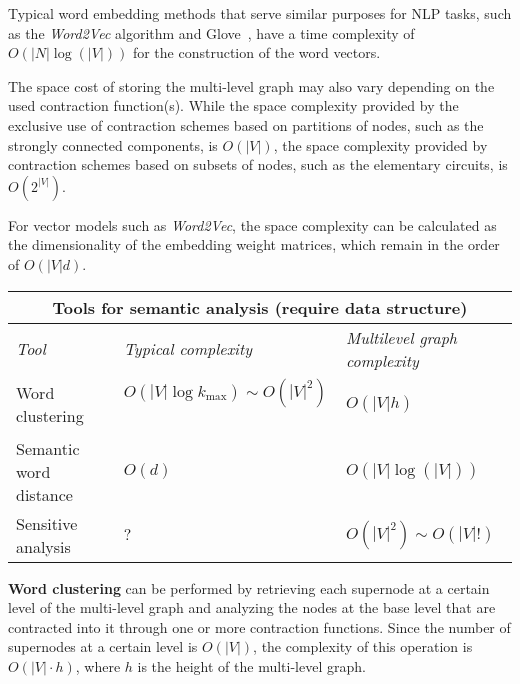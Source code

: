 Typical word embedding methods that serve similar purposes for NLP tasks, such as the \textit{Word2Vec} algorithm \cite{Mikolov13}
and Glove~\cite{Pennington14}, have a time complexity of $O(|N| \log(|V|))$ for the construction of the word vectors. \newline

The space cost of storing the multi-level graph may also vary depending on the used contraction function(s).
While the space complexity provided by the exclusive use of contraction schemes based on partitions of nodes, such as
the strongly connected components, is $O(|V|)$, the space complexity provided by contraction schemes based on subsets of
nodes, such as the elementary circuits, is $O(2^{|V|})$. \newline

For vector models such as \textit{Word2Vec}, the space complexity can be calculated as the dimensionality of the
embedding weight matrices, which remain in the order of $O(|V|d)$. \newline\newline


\begin{table}[hbt!]
    \begin{tabular}  {|l|l|l|}      \hline
        \multicolumn{3}{|c|}{\textbf{Tools for semantic analysis (require data structure)}} \\ [0.5ex]
        \hline
        \textit{Tool}                   &  \textit{Typical complexity}  & \textit{Multilevel graph complexity} \\ [0.5ex]
        \hline
        \large Word clustering    \,\,      &  \large $O(|V|\log{k_{\max}}) \sim  O(\left| V \right|^2)$  \,\,  &  \large $O(|V| h)$ \\
        \hline
        \large Semantic word distance \,\,   &  \large $O(d)$                &  \large $O(|V| \log(|V|))$ \\
        \hline
        \large Sensitive analysis       &  \large $?$                   &  \large $O(|V|^2)  \sim O(|V|!)$ \\
        \hline
    \end{tabular}\label{tab:table3}
\end{table}

\textbf{Word clustering} can be performed by retrieving each supernode at a certain level of the multi-level graph and
analyzing the nodes at the base level that are contracted into it through one or more contraction functions.
Since the number of supernodes at a certain level is $O(|V|)$, the complexity of this operation is $O(|V| \cdot h)$,
where $h$ is the height of the multi-level graph. \newline

